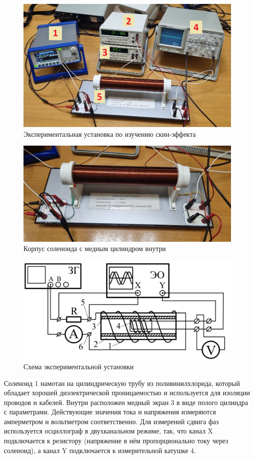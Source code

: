 \documentclass[a4paper, 12pt]{article} %
\begin{document}
\begin{figure}[h!]
    \centering
    \includegraphics[width=0.75\linewidth]{real installation sheme.png}
    \caption{Экспериментальная установка по изучению скин-эффекта}
    \label{real installation sheme}
\end{figure}

\begin{figure}[h!]
    \centering
    \includegraphics[width=0.75\linewidth]{copper cylinder.jpg}
    \caption{Корпус соленоида с медным цилиндром внутри}
    \label{copper cylinder}
\end{figure}

\begin{figure}[h!]
    \centering
    \includegraphics[width=0.75\linewidth]{installation_sheme.jpg}
    \caption{Схема экспериментальной установки}
    \label{installation sheme}
\end{figure}

Соленоид 1 намотан на цилиндрическую трубу из поливинилхлорида, который обладает хорошей диэлектрической проницаемостью и используется для изоляции проводов и кабелей. Внутри расположен медный экран 3 в виде полого цилиндра с параметрами. Действующие значения тока и напряжения измеряются амперметром и вольтметром соответственно. Для измерений сдвига фаз используется осциллограф в двухканальном режиме, так, что канал X подключается к резистору (напряжение в нём пропорционально току через соленоид), а канал Y подключается к измерительной катушке 4. 
\end{document}
